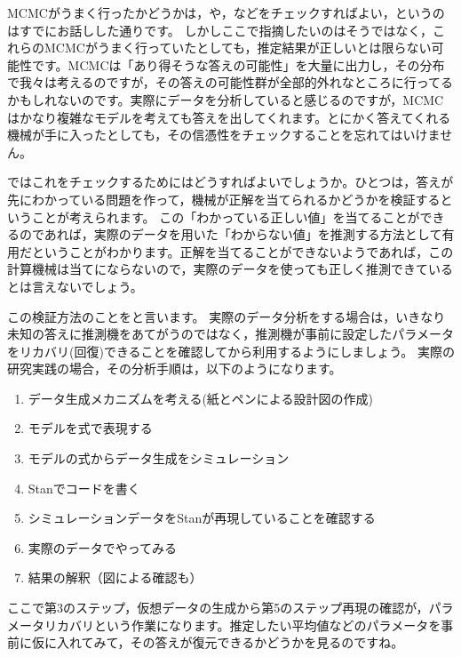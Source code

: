 \documentclass{ltjsbook}
\begin{document}
MCMCがうまく行ったかどうかは，や，などをチェックすればよい，というのはすでにお話しした通りです。
しかしここで指摘したいのはそうではなく，これらのMCMCがうまく行っていたとしても，推定結果が正しいとは限らない可能性です。MCMCは「あり得そうな答えの可能性」を大量に出力し，その分布で我々は考えるのですが，その答えの可能性群が全部的外れなところに行ってるかもしれないのです。実際にデータを分析していると感じるのですが，MCMCはかなり複雑なモデルを考えても答えを出してくれます。とにかく答えてくれる機械が手に入ったとしても，その信憑性をチェックすることを忘れてはいけません。

ではこれをチェックするためにはどうすればよいでしょうか。ひとつは，答えが先にわかっている問題を作って，機械が正解を当てられるかどうかを検証するということが考えられます。
この「わかっている正しい値」を当てることができるのであれば，実際のデータを用いた「わからない値」を推測する方法として有用だということがわかります。正解を当てることができないようであれば，この計算機械は当てにならないので，実際のデータを使っても正しく推測できているとは言えないでしょう。

この検証方法のことをと言います。
実際のデータ分析をする場合は，いきなり未知の答えに推測機をあてがうのではなく，推測機が事前に設定したパラメータをリカバリ(回復)できることを確認してから利用するようにしましょう。
実際の研究実践の場合，その分析手順は，以下のようになります。
\begin{enumerate}
	\item データ生成メカニズムを考える(紙とペンによる設計図の作成)
	\item モデルを式で表現する
	\item モデルの式からデータ生成をシミュレーション
	\item Stanでコードを書く
	\item シミュレーションデータをStanが再現していることを確認する
	\item 実際のデータでやってみる
	\item 結果の解釈（図による確認も）
\end{enumerate}
ここで第3のステップ，仮想データの生成から第5のステップ再現の確認が，パラメータリカバリという作業になります。推定したい平均値などのパラメータを事前に仮に入れてみて，その答えが復元できるかどうかを見るのですね。
\end{document}
